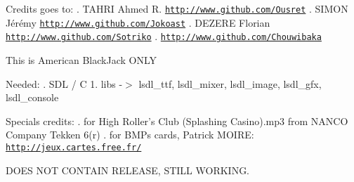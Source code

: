 Credits goes to\+: . T\+A\+H\+R\+I Ahmed R. \href{http://www.github.com/Ousret}{\tt http\+://www.\+github.\+com/\+Ousret} . S\+I\+M\+O\+N Jérémy \href{http://www.github.com/Jokoast}{\tt http\+://www.\+github.\+com/\+Jokoast} . D\+E\+Z\+E\+R\+E Florian \href{http://www.github.com/Sotriko}{\tt http\+://www.\+github.\+com/\+Sotriko} .  \href{http://www.github.com/Chouwibaka}{\tt http\+://www.\+github.\+com/\+Chouwibaka}

This is American Black\+Jack O\+N\+L\+Y

Needed\+: . S\+D\+L / C 1. libs -\/$>$ lsdl\+\_\+ttf, lsdl\+\_\+mixer, lsdl\+\_\+image, lsdl\+\_\+gfx, lsdl\+\_\+console

Specials credits\+: . for High Roller's Club (Splashing Casino).mp3 from N\+A\+N\+C\+O Company Tekken 6(r) . for B\+M\+Ps cards, Patrick M\+O\+I\+R\+E\+: \href{http://jeux.cartes.free.fr/}{\tt http\+://jeux.\+cartes.\+free.\+fr/}

D\+O\+E\+S N\+O\+T C\+O\+N\+T\+A\+I\+N R\+E\+L\+E\+A\+S\+E, S\+T\+I\+L\+L W\+O\+R\+K\+I\+N\+G. 